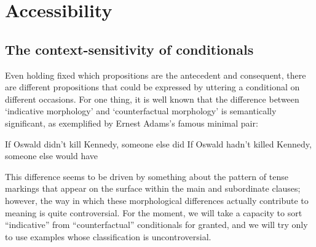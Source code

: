 \documentclass[If.tex]{subfiles}
\begin{document}
 

\chapter{Accessibility}\label{chap:accessibility}
\section{The context-sensitivity of conditionals} \label{sect:context}
Even holding fixed which propositions are the antecedent and consequent, there are different propositions that could be expressed by uttering a conditional on different occasions. For one thing, it is well known that the difference between ‘indicative morphology’ and ‘counterfactual morphology’ is semantically significant, as exemplified by Ernest Adams's famous minimal pair:
\begin{prop}
	\nitem	
	\begin{prop}
		\aitem \label{indoswald}
			If Oswald didn't kill Kennedy, someone else did
		\aitem \label{cfoswald}
			If Oswald hadn't killed Kennedy, someone else would have
	\end{prop}
\end{prop}
This difference seems to be driven by something about the pattern of tense markings that appear on the surface within the main and subordinate clauses; however, the way in which these morphological differences actually contribute to meaning is quite controversial. For the moment, we will take a capacity to sort “indicative” from “counterfactual” conditionals for granted, and we will try only to use examples whose classification is uncontroversial.
\end{document}

